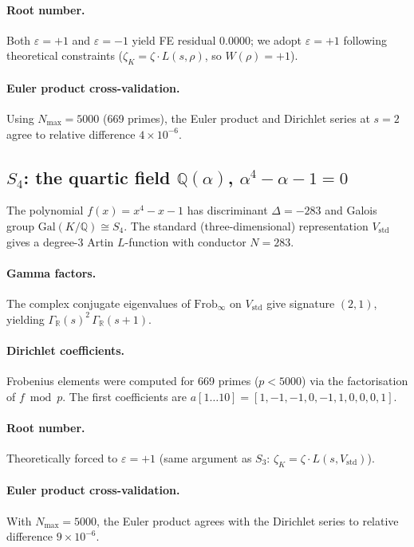 \documentclass[11pt, a4paper]{article}
\theoremstyle{plain}
\theoremstyle{definition}
\newcommand{\Gal}{\mathrm{Gal}}       %
\newcommand{\Frob}{\mathrm{Frob}}     %
\begin{document}
\paragraph{Root number.}
Both $\varepsilon = +1$ and $\varepsilon = -1$ yield FE residual
$0.0000$; we adopt $\varepsilon = +1$ following theoretical
constraints ($\zeta_{K} = \zeta \cdot L(s,\rho)$, so
$W(\rho)=+1$).

\paragraph{Euler product cross-validation.}
Using $N_{\max} = 5000$ (669 primes), the Euler product and Dirichlet
series at $s=2$ agree to relative difference $4\times10^{-6}$.


\subsection{$S_{4}$: the quartic field $\mathbb{Q}(\alpha)$, $\alpha^{4}-\alpha-1=0$}
\label{sec:s4-setup}

The polynomial $f(x) = x^{4}-x-1$ has discriminant $\Delta = -283$
and Galois group $\Gal(K/\mathbb{Q}) \cong S_{4}$.  The standard
(three-dimensional) representation $V_{\mathrm{std}}$ gives a
degree-3 Artin $L$-function with conductor $N = 283$.

\paragraph{Gamma factors.}
The complex conjugate eigenvalues of $\Frob_{\infty}$ on
$V_{\mathrm{std}}$ give signature $(2,1)$, yielding
$\Gamma_{\mathbb{R}}(s)^{2}\,\Gamma_{\mathbb{R}}(s+1)$.

\paragraph{Dirichlet coefficients.}
Frobenius elements were computed for 669 primes ($p < 5000$) via the
factorisation of $f \bmod p$.  The first coefficients are
$a[1\ldots10] = [1, -1, -1, 0, -1, 1, 0, 0, 0, 1]$.

\paragraph{Root number.}
Theoretically forced to $\varepsilon = +1$ (same argument as $S_{3}$:
$\zeta_{K} = \zeta \cdot L(s,V_{\mathrm{std}})$).

\paragraph{Euler product cross-validation.}
With $N_{\max}=5000$, the Euler product agrees with the Dirichlet
series to relative difference $9 \times 10^{-6}$.
\end{document}
